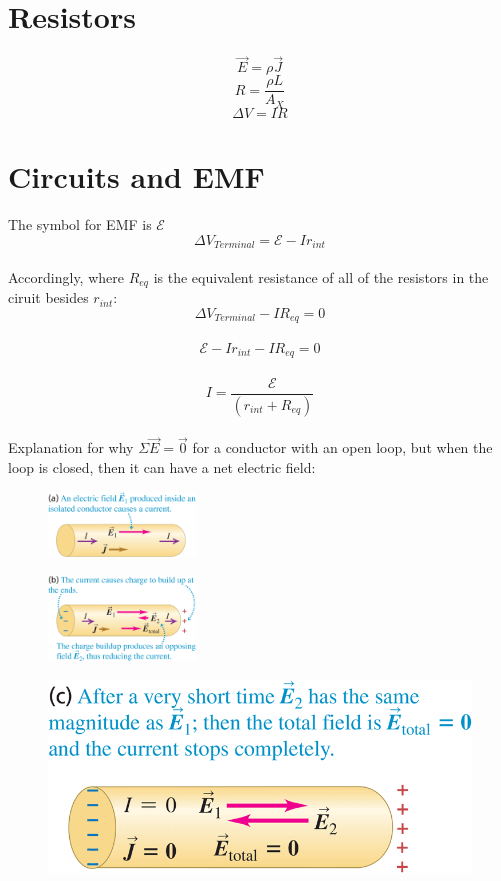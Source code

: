 \documentclass[10pt, a4paper, twocolumn]{article}
\begin{document}
    \section{Resistors}	
        $$\vec{E} = \rho \vec{J}$$
        $$R = \frac{\rho L}{A_X}$$
        $$\Delta V = IR$$
        
    \section{Circuits and EMF}	
        The symbol for EMF is $\mathcal{E}$\\
        $$\Delta V_{Terminal} = \mathcal{E} - I r_{int}$$\\
        Accordingly, where $R_{eq}$ is the equivalent resistance of all of the resistors in the ciruit besides $r_{int}$:
        $$\Delta V_{Terminal} - I R_{eq} = 0$$\\
        $$\mathcal{E} - I r_{int} - I R_{eq} = 0$$\\
        $$I = \frac{\mathcal{E}}{(r_{int} + R_{eq})}$$\\
        
        Explanation for why $\Sigma \vec{E} = \vec{0}$ for a conductor with an open loop, but when the loop is closed, then it can have a net electric field:\\
        \begin{figure}[H]
            \includegraphics[width=0.35\textwidth]{25-11-A} %
        \end{figure}

        \begin{figure}[H]
            \includegraphics[width=0.35\textwidth]{25-11-B} %
        \end{figure}

        \begin{figure}[H]
            \includegraphics[width=0.9\linewidth]{25-11-C} %
        \end{figure}
\end{document}
